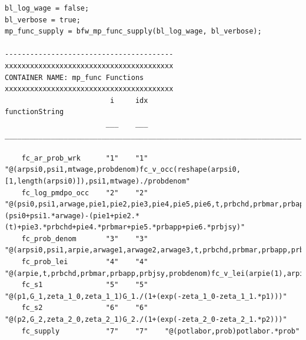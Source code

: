 \documentclass[
]{book}
\begin{document}
\begin{verbatim}
bl_log_wage = false;
bl_verbose = true;
mp_func_supply = bfw_mp_func_supply(bl_log_wage, bl_verbose);

----------------------------------------
xxxxxxxxxxxxxxxxxxxxxxxxxxxxxxxxxxxxxxxx
CONTAINER NAME: mp_func Functions
xxxxxxxxxxxxxxxxxxxxxxxxxxxxxxxxxxxxxxxx
                         i     idx                                                                                                                                   functionString                                                                                                                               
                        ___    ___    ____________________________________________________________________________________________________________________________________________________________________________________________________________________________________________________________________________

    fc_ar_prob_wrk      "1"    "1"    "@(arpsi0,psi1,mtwage,probdenom)fc_v_occ(reshape(arpsi0,[1,length(arpsi0)]),psi1,mtwage)./probdenom"                                                                                                                                                                        
    fc_log_pmdpo_occ    "2"    "2"    "@(psi0,psi1,arwage,pie1,pie2,pie3,pie4,pie5,pie6,t,prbchd,prbmar,prbapp,prbjsy)(psi0+psi1.*arwage)-(pie1+pie2.*(t)+pie3.*prbchd+pie4.*prbmar+pie5.*prbapp+pie6.*prbjsy)"                                                                                                   
    fc_prob_denom       "3"    "3"    "@(arpsi0,psi1,arpie,arwage1,arwage2,arwage3,t,prbchd,prbmar,prbapp,prbjsy)fc_v_occ(arpsi0(1),psi1,arwage1)+fc_v_occ(arpsi0(2),psi1,arwage2)+fc_v_occ(arpsi0(3),psi1,arwage3)+fc_v_lei(arpie(1),arpie(2),arpie(3),arpie(4),arpie(5),arpie(6),t,prbchd,prbmar,prbapp,prbjsy)"
    fc_prob_lei         "4"    "4"    "@(arpie,t,prbchd,prbmar,prbapp,prbjsy,probdenom)fc_v_lei(arpie(1),arpie(2),arpie(3),arpie(4),arpie(5),arpie(6),t,prbchd,prbmar,prbapp,prbjsy)./probdenom"                                                                                                                  
    fc_s1               "5"    "5"    "@(p1,G_1,zeta_1_0,zeta_1_1)G_1./(1+(exp(-zeta_1_0-zeta_1_1.*p1)))"                                                                                                                                                                                                         
    fc_s2               "6"    "6"    "@(p2,G_2,zeta_2_0,zeta_2_1)G_2./(1+(exp(-zeta_2_0-zeta_2_1.*p2)))"                                                                                                                                                                                                         
    fc_supply           "7"    "7"    "@(potlabor,prob)potlabor.*prob"                                                                                                                                                                                                                                            
\end{verbatim}
\end{document}
